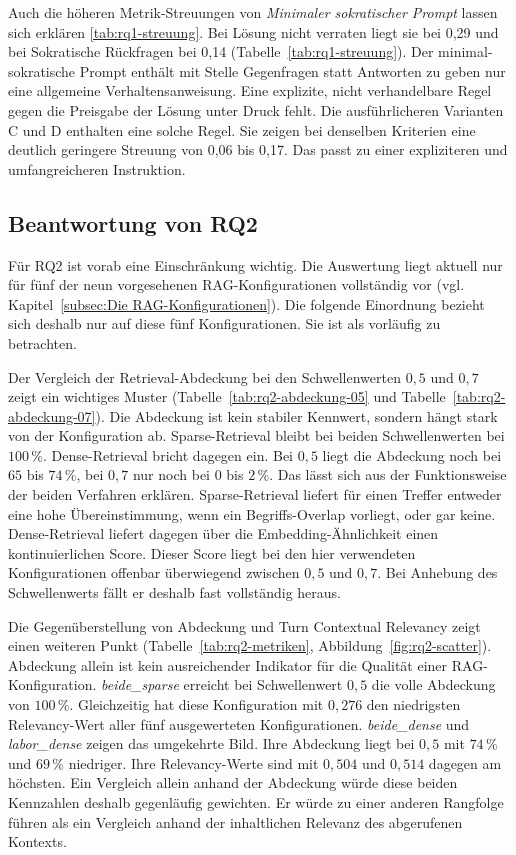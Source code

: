 Auch die höheren Metrik-Streuungen von \emph{Minimaler sokratischer Prompt} lassen sich erklären \ref{tab:rq1-streuung}. Bei \glqq
Lösung nicht verraten\grqq{} liegt sie bei 0,29 und bei \glqq Sokratische Rückfragen\grqq{} bei
0,14 (Tabelle~\ref{tab:rq1-streuung}). Der minimal-sokratische Prompt enthält mit \glqq Stelle Gegenfragen
statt Antworten zu geben\grqq{} nur eine allgemeine Verhaltensanweisung. Eine explizite, nicht
verhandelbare Regel gegen die Preisgabe der Lösung unter Druck fehlt. Die ausführlicheren Varianten
C und D enthalten eine solche Regel. Sie zeigen bei denselben Kriterien eine deutlich geringere
Streuung von 0,06 bis 0,17. Das passt zu einer expliziteren und umfangreicheren Instruktion.

\subsection{Beantwortung von RQ2}
\label{subsec:rq2-beantwortung}

Für RQ2 ist vorab eine Einschränkung wichtig. Die Auswertung liegt aktuell nur für fünf der neun
vorgesehenen RAG-Konfigurationen vollständig vor (vgl. Kapitel~\ref{subsec:Die RAG-Konfigurationen}). Die folgende
Einordnung bezieht sich deshalb nur auf diese fünf Konfigurationen. Sie ist als vorläufig zu
betrachten.

Der Vergleich der Retrieval-Abdeckung bei den Schwellenwerten $0{,}5$ und $0{,}7$ zeigt ein
wichtiges Muster (Tabelle~\ref{tab:rq2-abdeckung-05} und Tabelle~\ref{tab:rq2-abdeckung-07}). Die
Abdeckung ist kein stabiler Kennwert, sondern hängt stark von der Konfiguration ab. Sparse-Retrieval
bleibt bei beiden Schwellenwerten bei $100\,\%$. Dense-Retrieval bricht dagegen ein. Bei $0{,}5$
liegt die Abdeckung noch bei $65$ bis $74\,\%$, bei $0{,}7$ nur noch bei $0$ bis $2\,\%$. Das lässt
sich aus der Funktionsweise der beiden Verfahren erklären. Sparse-Retrieval liefert für einen
Treffer entweder eine hohe Übereinstimmung, wenn ein Begriffs-Overlap vorliegt, oder gar keine.
Dense-Retrieval liefert dagegen über die Embedding-Ähnlichkeit einen kontinuierlichen Score. Dieser
Score liegt bei den hier verwendeten Konfigurationen offenbar überwiegend zwischen $0{,}5$ und
$0{,}7$. Bei Anhebung des Schwellenwerts fällt er deshalb fast vollständig heraus.

Die Gegenüberstellung von Abdeckung und Turn Contextual Relevancy zeigt einen weiteren Punkt
(Tabelle~\ref{tab:rq2-metriken}, Abbildung~\ref{fig:rq2-scatter}). Abdeckung allein ist kein
ausreichender Indikator für die Qualität einer RAG-Konfiguration. \emph{beide\_sparse} erreicht bei
Schwellenwert $0{,}5$ die volle Abdeckung von $100\,\%$. Gleichzeitig hat diese Konfiguration mit
$0,276$ den niedrigsten Relevancy-Wert aller fünf ausgewerteten Konfigurationen.
\emph{beide\_dense} und \emph{labor\_dense} zeigen das umgekehrte Bild. Ihre Abdeckung liegt bei
$0{,}5$ mit $74\,\%$ und $69\,\%$ niedriger. Ihre Relevancy-Werte sind mit $0,504$ und $0,514$
dagegen am höchsten. Ein Vergleich allein anhand der Abdeckung würde diese beiden Kennzahlen
deshalb gegenläufig gewichten. Er würde zu einer anderen Rangfolge führen als ein Vergleich anhand
der inhaltlichen Relevanz des abgerufenen Kontexts.

